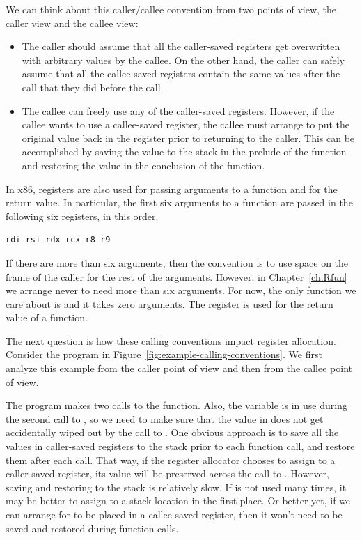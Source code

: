 \documentclass[11pt]{book}
\newcommand{\ocaml}[1]{{\color{blue}{#1}}}
\begin{document}
We can think about this caller/callee convention from two points of
view, the caller view and the callee view:
\begin{itemize}
\item The caller should assume that all the caller-saved registers get
  overwritten with arbitrary values by the callee.  On the other hand,
  the caller can safely assume that all the callee-saved registers
  contain the same values after the call that they did before the
  call.
\item The callee can freely use any of the caller-saved registers.
  However, if the callee wants to use a callee-saved register, the
  callee must arrange to put the original value back in the register
  prior to returning to the caller. This can be accomplished by saving
  the value to the stack in the prelude of the function and restoring
  the value in the conclusion of the function.
\end{itemize}

In x86, registers are also used for passing arguments to a function
and for the return value.  In particular, the first six arguments to a
function are passed in the following six registers, in this order.
\begin{lstlisting}
rdi rsi rdx rcx r8 r9
\end{lstlisting}
If there are more than six arguments, then the convention is to use
space on the frame of the caller for the rest of the
arguments. However, in Chapter~\ref{ch:Rfun} we arrange never to
need more than six arguments. For now, the only function we care about
is  and it takes zero arguments.
%
The register  is used for the return value of a function.

The next question is how these calling conventions impact register
allocation. Consider the \LangVar{} program in
Figure~\ref{fig:example-calling-conventions}.  We first analyze this
example from the caller point of view and then from the callee point
of view.

The program makes two calls to the  function.  Also, the
variable  is in use during the second call to , so
we need to make sure that the value in  does not get
accidentally wiped out by the call to .  One obvious
approach is to save all the values in caller-saved registers to the
stack prior to each function call, and restore them after each
call. That way, if the register allocator chooses to assign 
to a caller-saved register, its value will be preserved across the
call to .  However, saving and restoring to the stack is
relatively slow. If  is not used many times, it may be better
to assign  to a stack location in the first place. Or better
yet, if we can arrange for  to be placed in a callee-saved
register, then it won't need to be saved and restored during function
calls. \ocaml{(By the caller, that is. The callee might still need to save the
  register, but only if it actually needs to make use of that register for
  its own purposes.)}
\end{document}
